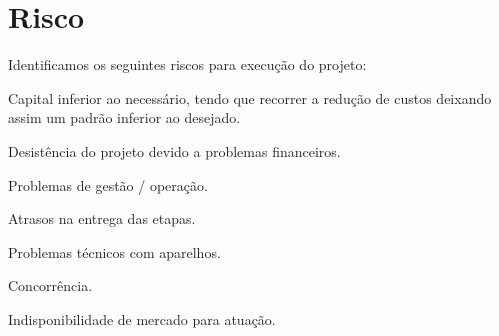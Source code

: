 \chapter[Risco]{Risco}

Identificamos os seguintes riscos para execução do projeto:

\begin{alineas}
    \item Capital inferior ao necessário, tendo que recorrer a redução de custos deixando assim um padrão inferior ao desejado.
    \item Desistência do projeto devido a problemas financeiros.
    \item Problemas de gestão / operação.
    \item Atrasos na entrega das etapas.
    \item Problemas técnicos com aparelhos.
    \item Concorrência.
    \item Indisponibilidade de mercado para atuação.
\end{alineas}

